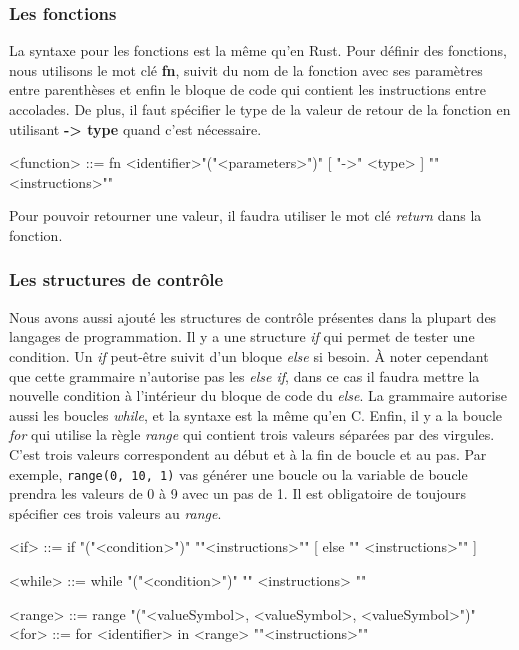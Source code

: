 \documentclass[a4paper]{article}%
\begin{document}
\subsubsection*{Les fonctions}

La syntaxe pour les fonctions est la même qu'en Rust. Pour définir des
fonctions, nous utilisons le mot clé \textbf{fn}, suivit du nom de la fonction
avec ses paramètres entre parenthèses et enfin le bloque de code qui contient
les instructions entre accolades. De plus, il faut spécifier le type de la valeur
de retour de la fonction en utilisant \textbf{-> type} quand c'est nécessaire.

\begin{grammar}
<function> ::= fn <identifier>"("<parameters>")" [ "->" <type> ] "{"<instructions>"}"
\end{grammar}\leavevmode\newline

Pour pouvoir retourner une valeur, il faudra utiliser le mot clé \textit{return}
dans la fonction.

\subsubsection*{Les structures de contrôle}

Nous avons aussi ajouté les structures de contrôle présentes dans la plupart des
langages de programmation. Il y a une structure \textit{if} qui permet de tester
une condition. Un \textit{if} peut-être suivit d'un bloque \textit{else} si
besoin. À noter cependant que cette grammaire n'autorise pas les \textit{else
if}, dans ce cas il faudra mettre la nouvelle condition à l'intérieur du bloque
de code du \textit{else}. La grammaire autorise aussi les boucles
\textit{while}, et la syntaxe est la même qu'en C. Enfin, il y a la boucle
\textit{for} qui utilise la règle \textit{range} qui contient trois valeurs
séparées par des virgules. C'est trois valeurs correspondent au début et à la fin
de boucle et au pas. Par exemple, \lstinline{range(0, 10, 1)} vas générer une
boucle ou la variable de boucle prendra les valeurs de 0 à 9 avec un pas de 1.
Il est obligatoire de toujours spécifier ces trois valeurs au \textit{range}.

\begin{grammar}
<if> ::= if "("<condition>")" "{"<instructions>"}" [ else "{" <instructions>"}" ]

<while> ::= while "("<condition>")" "{" <instructions> "}"

<range> ::= range "("<valueSymbol>, <valueSymbol>, <valueSymbol>")"
<for> ::= for <identifier> in <range> "{"<instructions>"}"
\end{grammar}\leavevmode\newline
\end{document}
